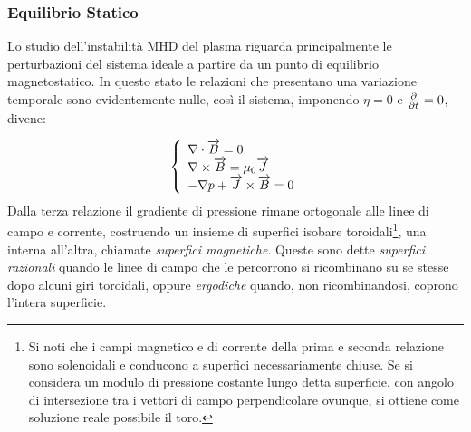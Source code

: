 \subsubsection{Equilibrio Statico}
Lo studio dell'instabilità MHD del plasma riguarda principalmente le
perturbazioni del sistema ideale a partire da un punto di equilibrio
magnetostatico. In questo stato le relazioni che presentano una
variazione temporale sono evidentemente nulle, così il sistema,
imponendo $\eta = 0$ e $\frac{\partial }{\partial t}=0$, divene:

\begin{equation}
 \label{mhd_ideal}
 \left\{
  \begin{array}{l}
   \nabla \cdot \overrightarrow{B} = 0 \\
   \nabla \times \overrightarrow{B} = \mu_0 \overrightarrow{J} \\
   -\nabla p + \overrightarrow{J} \times \overrightarrow{B} = 0
  \end{array}
 \right.
\end{equation}
Dalla terza relazione il gradiente di pressione rimane ortogonale alle
linee di campo e corrente, costruendo un insieme di superfici isobare
toroidali\footnote{Si noti che i campi magnetico e di corrente della
prima e seconda relazione sono solenoidali e conducono a superfici
necessariamente chiuse. Se si considera un modulo di pressione costante
lungo detta superficie, con angolo di intersezione tra i vettori di
campo perpendicolare ovunque, si ottiene come soluzione reale possibile
il toro.}, una interna all'altra, chiamate \emph{superfici
magnetiche}\cite{boydsand}.
Queste sono dette \emph{superfici razionali} quando le linee di campo
che le percorrono si ricombinano su se stesse dopo alcuni giri
toroidali, oppure \emph{ergodiche} quando, non ricombinandosi, coprono
l'intera superficie.

